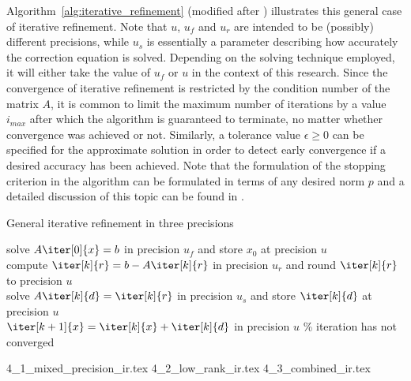 \noindent Algorithm~\hyperref[alg:iterative_refinement]{\ref{alg:iterative_refinement}} (modified after \cite{carson_new_2017}) illustrates this general case of iterative refinement. Note that $u$, $u_f$ and $u_r$ are intended to be (possibly) different precisions, while $u_s$ is essentially a parameter describing how accurately the correction equation is solved. Depending on the solving technique employed, it will either take the value of $u_f$ or $u$ in the context of this research. Since the convergence of iterative refinement is restricted by the condition number of the matrix $A$, it is common to limit the maximum number of iterations by a value $i_{max}$ after which the algorithm is guaranteed to terminate, no matter whether convergence was achieved or not. Similarly, a tolerance value $\epsilon \geq 0$ can be specified for the approximate solution in order to detect early convergence if a desired accuracy has been achieved.  Note that the formulation of the stopping criterion in the algorithm can be formulated in terms of any desired norm $p$ and a detailed discussion of this topic can be found in \cite{demmel_error_2006}.

\begin{algorithm}[h]
  \caption{General iterative refinement in three precisions}
  \label{alg:iterative_refinement}
  \SetAlgoLined
  solve $A\iter[0]{x}=b$ in precision $u_f$ and store $x_0$ at precision $u$ \\
   {
    compute $\iter[k]{r} = b-A\iter[k]{r}$ in precision $u_r$ and round $\iter[k]{r}$ to precision $u$ \\
    solve $A\iter[k]{d}=\iter[k]{r}$ in precision $u_s$ and store $\iter[k]{d}$ at precision $u$ \\
    $\iter[k+1]{x}=\iter[k]{x}+\iter[k]{d}$ in precision $u$}
  \% iteration has not converged
\end{algorithm}

{4_1_mixed_precision_ir.tex}
{4_2_low_rank_ir.tex}
{4_3_combined_ir.tex}